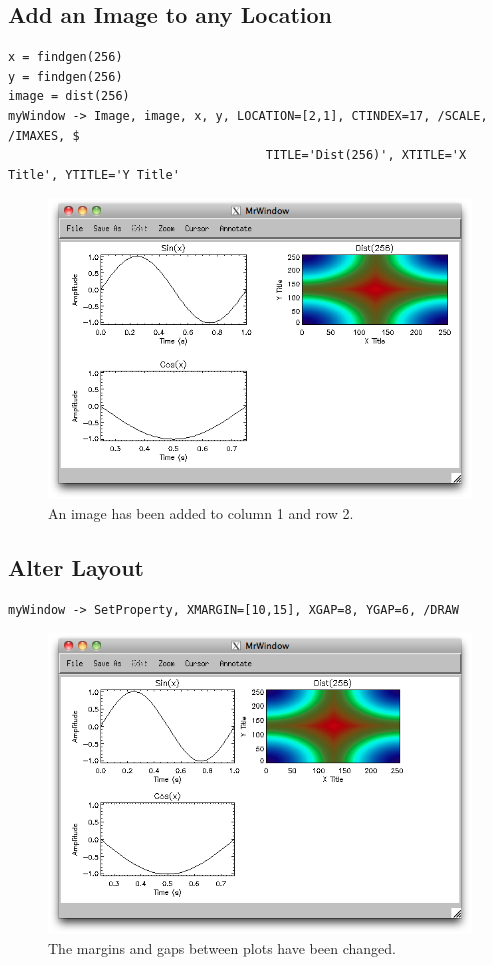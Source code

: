 \documentclass[12pt, letterpaper, oneside]{article}		%
\begin{document}
\subsection{Add an Image to any Location}

\begin{lstlisting}
x = findgen(256)
y = findgen(256)
image = dist(256)
myWindow -> Image, image, x, y, LOCATION=[2,1], CTINDEX=17, /SCALE, /IMAXES, $
                                    TITLE='Dist(256)', XTITLE='X Title', YTITLE='Y Title'
\end{lstlisting}

\begin{figure}[h!]
	\centering
	\includegraphics[width=0.5 \textwidth]{./figures/Add-Image.png}
	\caption[Add and Image.]
	{An image has been added to column 1 and row 2.}
\end{figure}

\subsection{Alter Layout}

\begin{lstlisting}
myWindow -> SetProperty, XMARGIN=[10,15], XGAP=8, YGAP=6, /DRAW
\end{lstlisting}

\begin{figure}[h!]
	\centering
	\includegraphics[width=0.5 \textwidth]{./figures/Adjust-Layout.png}
	\caption[Adjust the Plot Layout.]
	{The margins and gaps between plots have been changed.}
\end{figure}
\end{document}
